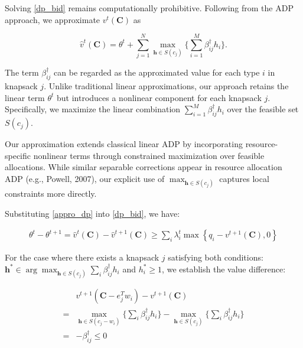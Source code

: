 Solving \eqref{dp_bid} remains computationally prohibitive. Following from the ADP approach, we approximate $v^{t}(\bm{C})$ as 

\begin{equation}\label{appro_dp}
    \hat{v}^{t}(\bm{C}) = \theta^{t} + \sum_{j=1}^{N} \max_{\bm{h} \in S(c_{j})} \{\sum_{i=1}^{M} \beta_{ij}^{\dag} h_{i}\}.
\end{equation}

The term $\beta_{ij}^{\dag}$ can be regarded as the approximated value for each type $i$ in knapsack $j$. Unlike traditional linear approximations, our approach retains the linear term $\theta^{t}$ but introduces a nonlinear component for each knapsack $j$. Specifically, we maximize the linear combination $\sum_{i=1}^{M} \beta_{ij}^{\dag} h_{i}$ over the feasible set $S(c_{j})$.

Our approximation extends classical linear ADP by incorporating resource-specific nonlinear terms through constrained maximization over feasible allocations. While similar separable corrections appear in resource allocation ADP (e.g., Powell, 2007), our explicit use of $\max_{\bm{h} \in S(c_j)}$ captures local constraints more directly.



Substituting \eqref{appro_dp} into \eqref{dp_bid}, we have:

\begin{align}
    \theta^{t} - \theta^{t+1} = \hat{v}^{t}(\bm{C}) - \hat{v}^{t+1}(\bm{C}) \geq \sum_{i} \lambda_{i}^{t} \max\left\{q_{i} - v^{t+1}(\bm{C}), 0\right\}
\end{align}

For the case where there exists a knapsack $j$ satisfying both conditions: $\bm{h}^{*} \in \arg\max_{\bm{h} \in S(c_j)} \sum_{i} \beta_{ij}^{\dag} h_{i}$ and $h_{i}^{*} \geq 1$, we establish the value difference: 

\begin{align*}
    & v^{t+1}(\bm{C} - e_{j}^{T} w_{i}) - v^{t+1}(\bm{C}) \\ 
  = & \max_{\bm{h} \in S(c_{j}- w_{i})} \{\sum_{i} \beta_{ij}^{\dag} h_{i}\} - \max_{\bm{h} \in S(c_{j})} \{\sum_{i} \beta_{ij}^{\dag} h_{i}\} \\
  = & -\beta_{ij}^{\dag} \leq 0
\end{align*}

